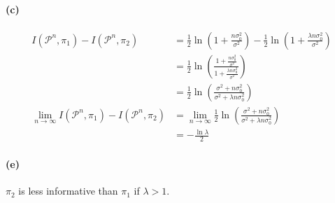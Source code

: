 \paragraph{(c)}
\begin{align*}
    I(\mathcal{P}^n, \pi_1) - I(\mathcal{P}^n, \pi_2)
    &= \frac{1}{2} \ln \left(1 + \frac{n\sigma_0^2}{\sigma^2} \right) -
        \frac{1}{2} \ln \left(1 + \frac{\lambda n\sigma_0^2}{\sigma^2} \right) \\
    &= \frac{1}{2}\ln \left( \frac{1 + \frac{n\sigma_0^2}{\sigma^2}}
        {1 + \frac{\lambda n\sigma_0^2}{\sigma^2}} \right)\\
    &= \frac{1}{2} \ln \left( \frac{\sigma^2 + n\sigma_0^2}{ \sigma^2 + \lambda n
        \sigma_0^2} \right)\\
    \lim_{n\rightarrow\infty} I(\mathcal{P}^n, \pi_1) - I(\mathcal{P}^n, \pi_2)
    &= \lim_{n\rightarrow\infty} \frac{1}{2} \ln \left( \frac{\sigma^2 + n\sigma_0^2}{ \sigma^2 + \lambda n
        \sigma_0^2} \right)\\
    &= -\frac{\ln \lambda}{2}
\end{align*}

\paragraph{(e)}
$\pi_2$ is less informative than $\pi_1$ if $\lambda > 1$.